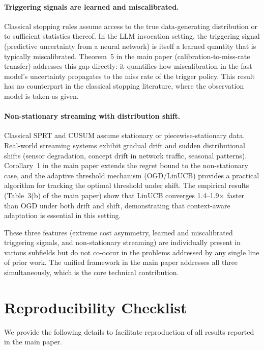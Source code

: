 \paragraph{Triggering signals are learned and miscalibrated.}
Classical stopping rules assume access to the true data-generating distribution or to sufficient statistics thereof.
In the LLM invocation setting, the triggering signal (predictive uncertainty from a neural network) is itself a learned quantity that is typically miscalibrated.
Theorem~5 in the main paper (calibration-to-miss-rate transfer) addresses this gap directly: it quantifies how miscalibration in the fast model's uncertainty propagates to the miss rate of the trigger policy.
This result has no counterpart in the classical stopping literature, where the observation model is taken as given.

\paragraph{Non-stationary streaming with distribution shift.}
Classical SPRT and CUSUM assume stationary or piecewise-stationary data.
Real-world streaming systems exhibit gradual drift and sudden distributional shifts (sensor degradation, concept drift in network traffic, seasonal patterns).
Corollary~1 in the main paper extends the regret bound to the non-stationary case, and the adaptive threshold mechanism (OGD/LinUCB) provides a practical algorithm for tracking the optimal threshold under shift.
The empirical results (Table~3(b) of the main paper) show that LinUCB converges 1.4--1.9$\times$ faster than OGD under both drift and shift, demonstrating that context-aware adaptation is essential in this setting.

These three features (extreme cost asymmetry, learned and miscalibrated triggering signals, and non-stationary streaming) are individually present in various subfields but do not co-occur in the problems addressed by any single line of prior work.
The unified framework in the main paper addresses all three simultaneously, which is the core technical contribution.


\section{Reproducibility Checklist}
\label{app:reproducibility}

We provide the following details to facilitate reproduction of all results reported in the main paper.


